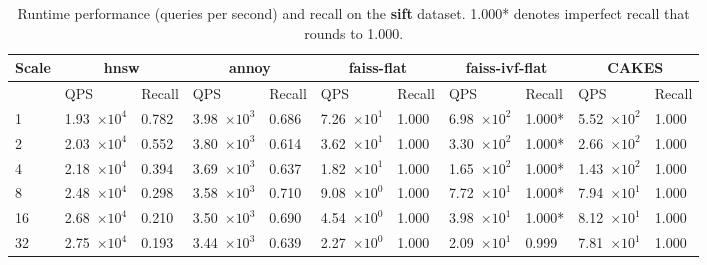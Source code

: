 \begin{table}[!t]
    \caption{Runtime performance (queries per second) and recall on the \textbf{sift} dataset. 1.000* denotes imperfect recall that rounds to 1.000.}
    \label{table:results:ann-sift}
    \vskip 0.15in
    \begin{center}
        \begin{small}
            \begin{sc}
                \begin{tabular}{|l|p{1.2cm}|p{0.8cm}|p{1.2cm}|p{0.8cm}|p{1.2cm}|p{0.8cm}|p{1.2cm}|p{0.8cm}|p{1.2cm}|p{0.8cm}|}
                    \hline
                    \textbf{Scale}  & \multicolumn{2}{|c|}{\textbf{hnsw}}  & \multicolumn{2}{|c|}{\textbf{annoy}} & \multicolumn{2}{|c|}{\textbf{faiss-flat}} & \multicolumn{2}{|c|}{\textbf{faiss-ivf-flat}}  & \multicolumn{2}{|c|}{\textbf{CAKES}} \\
                    \hline
                    &             QPS & Recall        & QPS & Recall      & QPS & Recall       & QPS & Recall    & QPS & Recall    \\
                    \hline
                    1   & 1.93~$\times10^{4}$ & 0.782 & 3.98~$\times10^{3}$ & 0.686 & 7.26~$\times10^{1}$  & 1.000 & 6.98~$\times10^{2}$ & 1.000* & 5.52~$\times10^{2}$ & 1.000 \\
                    \hline
                    2   & 2.03~$\times10^{4}$ & 0.552 & 3.80~$\times10^{3}$ & 0.614 & 3.62~$\times10^{1}$  & 1.000 & 3.30~$\times10^{2}$ & 1.000* & 2.66~$\times10^{2}$ & 1.000 \\
                    \hline
                    4   & 2.18~$\times10^{4}$ & 0.394 & 3.69~$\times10^{3}$ & 0.637 & 1.82~$\times10^{1}$  & 1.000 & 1.65~$\times10^{2}$ & 1.000* & 1.43~$\times10^{2}$ & 1.000 \\
                    \hline
                    8   & 2.48~$\times10^{4}$ & 0.298 & 3.58~$\times10^{3}$ & 0.710 & 9.08~$\times10^{0}$  & 1.000 & 7.72~$\times10^{1}$ & 1.000* & 7.94~$\times10^{1}$ & 1.000 \\
                    \hline
                    16  & 2.68~$\times10^{4}$ & 0.210 & 3.50~$\times10^{3}$ & 0.690 & 4.54~$\times10^{0}$  & 1.000 & 3.98~$\times10^{1}$ & 1.000* & 8.12~$\times10^{1}$ & 1.000 \\
                    \hline
                    32  & 2.75~$\times10^{4}$ & 0.193 & 3.44~$\times10^{3}$ & 0.639 & 2.27~$\times10^{0}$  & 1.000 & 2.09~$\times10^{1}$ & 0.999  & 7.81~$\times10^{1}$ & 1.000 \\

\end{tabular}
\end{sc}
\end{small}
\end{center}
\end{table}
